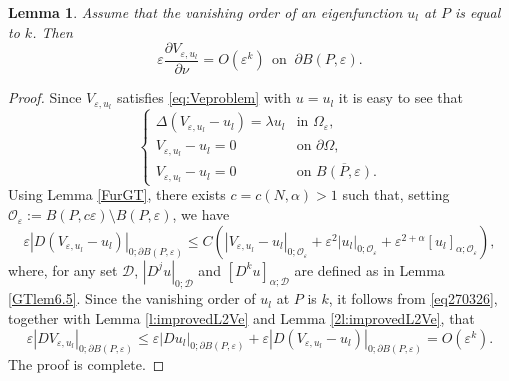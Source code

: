 \documentclass[11pt,reqno]{article}
\newtheorem{lemma}[teo]{Lemma}
\numberwithin{equation}{section}
\newcommand\e\varepsilon
\newcommand\x\times
\begin{document}
        
       \begin{lemma}\label{lem2810}
      Assume that  the vanishing order of an eigenfunction $u_l$ at $P$ is equal to $k$. Then
\begin{equation*}
\e\frac{\partial V_{\e,u_l}}{\partial \nu}=O(\e^{k}) \ \ \text{on }\ \partial B(P,\e).
\end{equation*}
\end{lemma}
\begin{proof}
      Since $V_{\e,u_l}$ satisfies \eqref{eq:Veproblem} with $u=u_l$ it is easy to see that
 \begin{equation*}
     	\begin{cases}
			\Delta (V_{\e,u_l}-u_l) =\lambda u_l &\text{in }\Omega_\e,\\
			V_{\e,u_l}-u_l=0 &\text{on }\partial \Omega,\\
			V_{\e,u_l}-u_l =0 &\text{on }\overline{ B(P,\e)}.
		\end{cases}
 \end{equation*}
 Using Lemma \ref{FurGT},  there exists $c=c(N,\alpha)>1$ such that, setting $\mathcal{O}_\e:=B(P,c\e)\setminus B(P,\e)$, we have
 \begin{equation}\label{eq270326}
    \e |D(V_{\e,u_l}-u_l)|_{0;\partial B(P,\e)}\leq C(|V_{\e,u_l}-u_l|_{0;\mathcal{O}_\e}+\e^2 |u_l|_{0;\mathcal{O}_\e}+\e^{2+\alpha}[u_l]_{\alpha;\mathcal{O}_\e}),
 \end{equation}
 where, for any set $\mathcal{D}$, $|D^ju|_{0;\mathcal{D}}$ and $[D^ku]_{\alpha;\mathcal{D}}$ are defined as in Lemma \ref{GTlem6.5}.
 Since the  vanishing order of $u_l$ at $P$ is  $k$,  it follows from \eqref{eq270326}, together with Lemma \ref{l:improvedL2Ve} and Lemma \ref{2l:improvedL2Ve}, that 
 \begin{equation*}
     \e|DV_{\e,u_l}|_{0;\partial B(P,\e)}\leq \e|Du_l|_{0;\partial B(P,\e)}+\e |D(V_{\e,u_l}-u_l)|_{0;\partial B(P,\e)}=O(\e^k).
 \end{equation*}
 The proof is complete.
    \end{proof}
\end{document}
